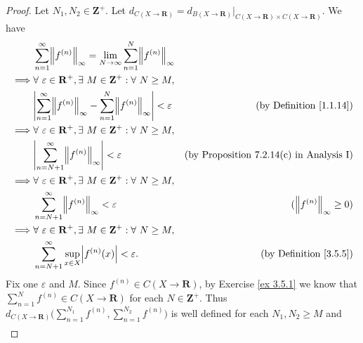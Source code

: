 \begin{proof}
    Let \(N_1, N_2 \in \mathbf{Z}^+\).
    Let \(d_{C(X \to \mathbf{R})} = d_{B(X \to \mathbf{R})}|_{C(X \to \mathbf{R}) \times C(X \to \mathbf{R})}\).
    We have
    \begin{align*}
                 & \sum_{n = 1}^\infty \norm*{f^{(n)}}_\infty = \lim_{N \to \infty} \sum_{n = 1}^N \norm*{f^{(n)}}_\infty                                                    \\
        \implies & \forall\ \varepsilon \in \mathbf{R}^+, \exists\ M \in \mathbf{Z}^+ : \forall\ N \geq M,                                                                   \\
                 & \abs*{\sum_{n = 1}^\infty \norm*{f^{(n)}}_\infty - \sum_{n = 1}^N \norm*{f^{(n)}}_\infty} < \varepsilon & \text{(by Definition \ref{1.1.14})}             \\
        \implies & \forall\ \varepsilon \in \mathbf{R}^+, \exists\ M \in \mathbf{Z}^+ : \forall\ N \geq M,                                                                   \\
                 & \abs*{\sum_{n = N + 1}^\infty \norm*{f^{(n)}}_\infty} < \varepsilon                                     & \text{(by Proposition 7.2.14(c) in Analysis I)} \\
        \implies & \forall\ \varepsilon \in \mathbf{R}^+, \exists\ M \in \mathbf{Z}^+ : \forall\ N \geq M,                                                                   \\
                 & \sum_{n = N + 1}^\infty \norm*{f^{(n)}}_\infty < \varepsilon                                            & (\norm*{f^{(n)}}_\infty \geq 0)                 \\
        \implies & \forall\ \varepsilon \in \mathbf{R}^+, \exists\ M \in \mathbf{Z}^+ : \forall\ N \geq M,                                                                   \\
                 & \sum_{n = N + 1}^\infty \sup_{x \in X} \abs*{f^{(n)}(x)} < \varepsilon.                                 & \text{(by Definition \ref{3.5.5})}
    \end{align*}
    Fix one \(\varepsilon\) and \(M\).
    Since \(f^{(n)} \in C(X \to \mathbf{R})\), by Exercise \ref{ex 3.5.1} we know that \(\sum_{n = 1}^N f^{(n)} \in C(X \to \mathbf{R})\) for each \(N \in \mathbf{Z}^+\).
    Thus \(d_{C(X \to \mathbf{R})}\bigg(\sum_{n = 1}^{N_1} f^{(n)}, \sum_{n = 1}^{N_2} f^{(n)}\bigg)\) is well defined for each \(N_1, N_2 \geq M\) and
    \begin{align*}

\end{align*}
\end{proof}
